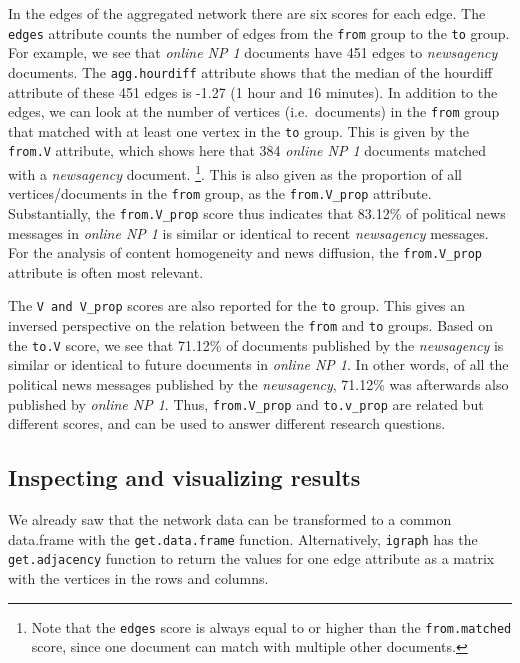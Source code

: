\documentclass[]{article}
\let\rmarkdownfootnote\footnote%
\def\footnote{\protect\rmarkdownfootnote}
\begin{document}
In the edges of the aggregated network there are six scores for each
edge. The \texttt{edges} attribute counts the number of edges from the
\texttt{from} group to the \texttt{to} group. For example, we see that
\emph{online NP 1} documents have 451 edges to \emph{newsagency}
documents. The \texttt{agg.hourdiff} attribute shows that the median of
the hourdiff attribute of these 451 edges is -1.27 (1 hour and 16
minutes). In addition to the edges, we can look at the number of
vertices (i.e.~documents) in the \texttt{from} group that matched with
at least one vertex in the \texttt{to} group. This is given by the
\texttt{from.V} attribute, which shows here that 384 \emph{online NP 1}
documents matched with a \emph{newsagency} document. \footnote{Note that
  the \texttt{edges} score is always equal to or higher than the
  \texttt{from.matched} score, since one document can match with
  multiple other documents.}. This is also given as the proportion of
all vertices/documents in the \texttt{from} group, as the
\texttt{from.V\_prop} attribute. Substantially, the
\texttt{from.V\_prop} score thus indicates that 83.12\% of political
news messages in \emph{online NP 1} is similar or identical to recent
\emph{newsagency} messages. For the analysis of content homogeneity and
news diffusion, the \texttt{from.V\_prop} attribute is often most
relevant.

The \texttt{V\textquotesingle{} and \textquotesingle{}V\_prop} scores
are also reported for the \texttt{to} group. This gives an inversed
perspective on the relation between the \texttt{from} and \texttt{to}
groups. Based on the \texttt{to.V} score, we see that 71.12\% of
documents published by the \emph{newsagency} is similar or identical to
future documents in \emph{online NP 1}. In other words, of all the
political news messages published by the \emph{newsagency}, 71.12\% was
afterwards also published by \emph{online NP 1}. Thus,
\texttt{from.V\_prop} and \texttt{to.v\_prop} are related but different
scores, and can be used to answer different research questions.

\subsection{Inspecting and visualizing
results}\label{inspecting-and-visualizing-results}

We already saw that the network data can be transformed to a common
data.frame with the \texttt{get.data.frame} function. Alternatively,
\texttt{igraph} has the \texttt{get.adjacency} function to return the
values for one edge attribute as a matrix with the vertices in the rows
and columns.
\end{document}

